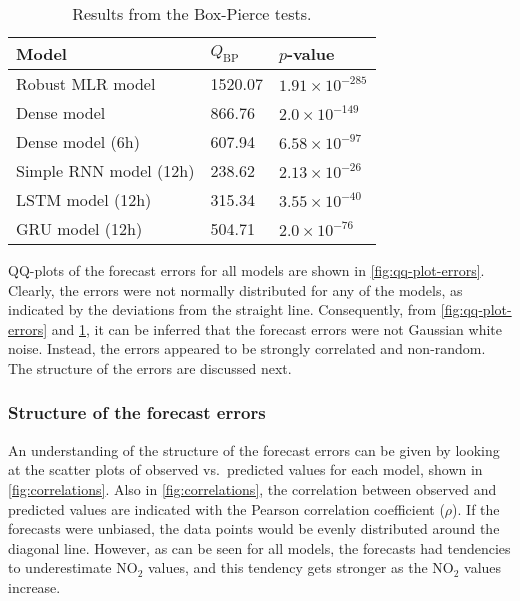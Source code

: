 \begin{table}[h]
\small
\centering
\caption{Results from the Box-Pierce tests.}
\label{tab:boxpierce}
\begin{tabular}{@{}lll@{}}
\toprule
Model                  & $Q_{\text{BP}}$ & $p$-value             \\ \midrule
Robust MLR model       & 1520.07         & $1.91\times10^{-285}$ \\
Dense model            & 866.76          & $2.0\times10^{-149}$  \\
Dense model (6h)       & 607.94          & $6.58\times10^{-97}$  \\
Simple RNN model (12h) & 238.62          & $2.13\times10^{-26}$  \\
LSTM model (12h)       & 315.34          & $3.55\times10^{-40}$  \\
GRU model (12h)        & 504.71          & $2.0\times10^{-76}$   \\ \bottomrule
\end{tabular}
\end{table}

\noindent
QQ-plots of the forecast errors for all models are shown in \cref{fig:qq-plot-errors}. Clearly, the errors were not normally distributed for any of the models, as indicated by the deviations from the straight line. Consequently, from \cref{fig:qq-plot-errors} and \cref{tab:boxpierce}, it can be inferred that the forecast errors were not Gaussian white noise. Instead, the errors appeared to be strongly correlated and non-random. The structure of the errors are discussed next.

\subsubsection{Structure of the forecast errors}
An understanding of the structure of the forecast errors can be given by looking at the scatter plots of observed vs.\ predicted values for each model, shown in \cref{fig:correlations}. Also in \cref{fig:correlations}, the correlation between observed and predicted values are indicated with the Pearson correlation coefficient ($\rho$). If the forecasts were unbiased, the data points would be evenly distributed around the diagonal line. However, as can be seen for all models, the forecasts had tendencies to underestimate NO$_2$ values, and this tendency gets stronger as the NO$_2$ values increase. 

